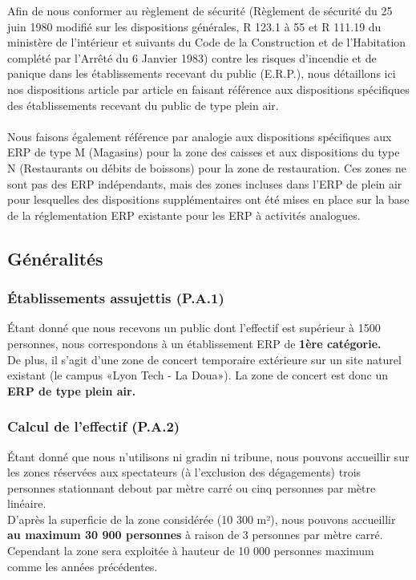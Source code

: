 \documentclass[hidelinks, paper=a4, fontsize=13pt]{report}
\begin{document}
Afin de nous conformer au règlement de sécurité (Règlement de sécurité du 25 juin 1980 modifié sur les dispositions générales, R 123.1 à 55 et R 111.19 du ministère de l’intérieur et suivants du Code de la Construction et de l’Habitation complété par l’Arrêté du 6 Janvier 1983) contre les risques d’incendie et de panique dans les établissements recevant du public (E.R.P.), nous détaillons ici nos dispositions article par article en faisant référence aux dispositions spécifiques des établissements recevant du public de type plein air.
\\\\
Nous faisons également référence par analogie aux dispositions spécifiques aux ERP de type  M (Magasins) pour la zone des caisses et aux dispositions du type N (Restaurants ou débits de boissons) pour la zone de restauration.
Ces zones ne sont pas des ERP indépendants, mais des zones incluses dans l’ERP de plein air pour lesquelles des dispositions supplémentaires ont été mises en place sur la base de la réglementation ERP existante pour les ERP à activités analogues.  

\subsection{Généralités}

\subsubsection{Établissements assujettis (P.A.1)}
Étant donné que nous recevons un public dont l’effectif est supérieur à 1500 personnes, nous correspondons à un établissement ERP de \textbf{1ère catégorie.} \\
De plus, il s’agit d’une zone de concert temporaire extérieure sur un site naturel existant (le campus «Lyon Tech - La Doua»). La zone de concert est donc un \textbf{ERP de type plein air.}

\subsubsection{Calcul de l’effectif (P.A.2)} 

Étant donné que nous n’utilisons ni gradin ni tribune, nous pouvons accueillir sur les zones réservées aux spectateurs (à l’exclusion des dégagements) trois personnes stationnant debout par mètre carré ou cinq personnes par mètre linéaire. \\
D’après la superficie de la zone considérée (10 300 m²), nous pouvons accueillir \textbf{au maximum 30 900  personnes} à raison de 3 personnes par mètre carré.
Cependant la zone sera exploitée à hauteur de 10 000 personnes maximum comme les années précédentes.
\end{document}
